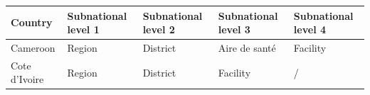 \documentclass[]{book}
\begin{document}
\begin{longtable}[]{@{}lllll@{}}
\toprule
\begin{minipage}[b]{0.07\columnwidth}\raggedright
Country\strut
\end{minipage} & \begin{minipage}[b]{0.20\columnwidth}\raggedright
Subnational level 1\strut
\end{minipage} & \begin{minipage}[b]{0.20\columnwidth}\raggedright
Subnational level 2\strut
\end{minipage} & \begin{minipage}[b]{0.20\columnwidth}\raggedright
Subnational level 3\strut
\end{minipage} & \begin{minipage}[b]{0.20\columnwidth}\raggedright
Subnational level 4\strut
\end{minipage}\tabularnewline
\midrule
\endhead
\begin{minipage}[t]{0.07\columnwidth}\raggedright
Cameroon\strut
\end{minipage} & \begin{minipage}[t]{0.20\columnwidth}\raggedright
Region\strut
\end{minipage} & \begin{minipage}[t]{0.20\columnwidth}\raggedright
District\strut
\end{minipage} & \begin{minipage}[t]{0.20\columnwidth}\raggedright
Aire de santé\strut
\end{minipage} & \begin{minipage}[t]{0.20\columnwidth}\raggedright
Facility\strut
\end{minipage}\tabularnewline
\begin{minipage}[t]{0.07\columnwidth}\raggedright
Cote d'Ivoire\strut
\end{minipage} & \begin{minipage}[t]{0.20\columnwidth}\raggedright
Region\strut
\end{minipage} & \begin{minipage}[t]{0.20\columnwidth}\raggedright
District\strut
\end{minipage} & \begin{minipage}[t]{0.20\columnwidth}\raggedright
Facility\strut
\end{minipage} & \begin{minipage}[t]{0.20\columnwidth}\raggedright
/\strut
\end{minipage}\tabularnewline

\end{longtable}
\end{document}
